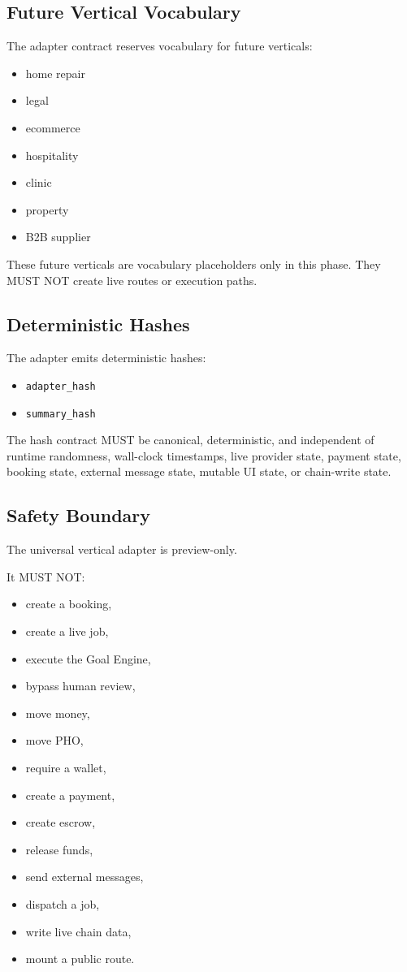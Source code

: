 \documentclass[11pt]{article}
\begin{document}
\subsection{Future Vertical Vocabulary}

The adapter contract reserves vocabulary for future verticals:

\begin{itemize}
  \item home repair
  \item legal
  \item ecommerce
  \item hospitality
  \item clinic
  \item property
  \item B2B supplier
\end{itemize}

These future verticals are vocabulary placeholders only in this phase. They MUST NOT create live routes or execution paths.

\subsection{Deterministic Hashes}

The adapter emits deterministic hashes:

\begin{itemize}
  \item \texttt{adapter\_hash}
  \item \texttt{summary\_hash}
\end{itemize}

The hash contract MUST be canonical, deterministic, and independent of runtime randomness, wall-clock timestamps, live provider state, payment state, booking state, external message state, mutable UI state, or chain-write state.

\subsection{Safety Boundary}

The universal vertical adapter is preview-only.

It MUST NOT:

\begin{itemize}
  \item create a booking,
  \item create a live job,
  \item execute the Goal Engine,
  \item bypass human review,
  \item move money,
  \item move PHO,
  \item require a wallet,
  \item create a payment,
  \item create escrow,
  \item release funds,
  \item send external messages,
  \item dispatch a job,
  \item write live chain data,
  \item mount a public route.
\end{itemize}
\end{document}
